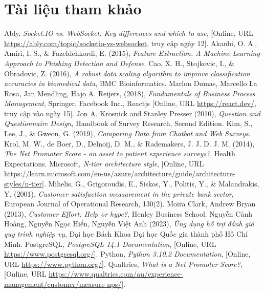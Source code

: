 \section{Tài liệu tham khảo}
\begin{thebibliography}{9}
     Ably, \textit{Socket.IO vs. WebSocket: Key differences and which to use}, [Online, URL\: \url{https://ably.com/topic/socketio-vs-websocket}, truy cập ngày 12].
     Akanbi, O. A., Amiri, I. S., \& Fazeldehkordi, E. (2015), \textit{Feature Extraction. A Machine-Learning Approach to Phishing Detection and Defense}.
     Cao, X. H., Stojkovic, I., \& Obradovic, Z. (2016), \textit{A robust data scaling algorithm to improve classification accuracies in biomedical data}, BMC Bioinformatics.
     Marlon Dumas, Marcello La Rosa, Jan Mendling, Hajo A. Reijers, (2018), \textit{Fundamentals of Business Process Management}, Springer.
     Facebook Inc., Reactjs [Online, URL\: \url{https://react.dev/}, truy cập vào ngày 15].
     Jon A. Krosnick and Stanley Presser (2010), \textit{Question and Questionnaire Design}, Handbook of Survey Research, Second Edition.
     Kim, S., Lee, J., \& Gweon, G. (2019), \textit{Comparing Data from Chatbot and Web Surveys}.
     Krol, M. W., de Boer, D., Delnoij, D. M., \& Rademakers, J. J. D. J. M. (2014), \textit{The Net Promoter Score - an asset to patient experience surveys?}, Health Expectations.
     Microsoft, \textit{N-tier architecture style}, [Online, URL\: \url{https://learn.microsoft.com/en-us/azure/architecture/guide/architecture-styles/n-tier}].
     Mihelis, G., Grigoroudis, E., Siskos, Y., Politis, Y., \& Malandrakis, Y. (2001), \textit{Customer satisfaction measurement in the private bank sector}, European Journal of Operational Research, 130(2).
     Moira Clark, Andrew Bryan (2013), \textit{Customer Effort: Help or hype?}, Henley Business School.
     Nguyễn Cảnh Hoàng, Nguyễn Ngọc Hiển, Nguyễn Việt Anh (2023), \textit{Ứng dụng hỗ trợ đánh giá quy trình nghiệp vụ}, Đại học Bách Khoa Đại học Quốc gia thành phố Hồ Chí Minh.
     PostgreSQL, \textit{PostgreSQL 14.1 Documentation}, [Online, URL\: \url{https://www.postgresql.org/}].
     Python, \textit{Python 3.10.2 Documentation}, [Online, URL\: \url{https://www.python.org/}].
     Qualtrics, \textit{What is a Net Promoter Score?}, [Online, URL\: \url{https://www.qualtrics.com/au/experience-management/customer/measure-nps/}].

\end{thebibliography}
